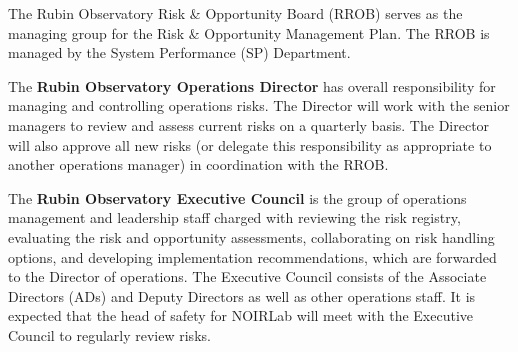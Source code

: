 The Rubin Observatory Risk \& Opportunity Board (RROB) serves as the managing group for the Risk \& Opportunity Management Plan.
The RROB is managed by the System Performance (SP) Department.

The \textbf{Rubin Observatory Operations Director} has overall responsibility for managing and controlling operations risks.
The Director will work with the senior managers to review and assess current risks on a quarterly basis.
The Director will also approve all new risks (or delegate this responsibility as appropriate to another operations manager) in coordination with the RROB.

The \textbf{Rubin Observatory Executive Council} is the group of operations management and leadership staff charged with reviewing the risk registry, evaluating the risk and opportunity assessments, collaborating on risk handling options, and developing implementation recommendations, which are forwarded to the Director of operations.
The Executive Council consists of the Associate Directors (ADs) and Deputy Directors as well as other operations staff.
It is expected that the head of safety for NOIRLab will meet with the Executive Council to regularly review risks.

